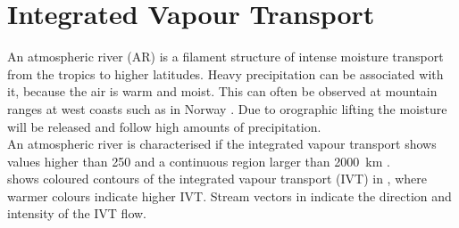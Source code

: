\section{Integrated Vapour Transport}
\label{sec:atm_riv}
An atmospheric river (AR) is a filament structure of intense moisture transport from the tropics to higher latitudes. Heavy precipitation can be associated with it, because the air is warm and moist. This can often be observed at mountain ranges at west coasts such as in Norway \citep{azad_extreme_2017}. Due to orographic lifting the moisture will be released and follow high amounts of precipitation. 
\\
An atmospheric river is characterised if the integrated vapour transport shows values higher than \SI{250}{\IVT} and a continuous region larger than \SI{2000}{\km} \citep{rutz_climatological_2014}.
\\
 shows coloured contours of the integrated vapour transport (IVT) in \SI{}{\IVT}, where warmer colours indicate higher IVT. 
Stream vectors in  indicate the direction and intensity of the IVT flow. 
